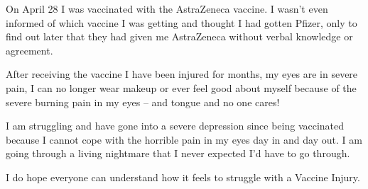 On April 28 I was vaccinated with the AstraZeneca vaccine. I wasn’t even
informed of which vaccine I was getting and thought I had gotten Pfizer, only to
find out later that they had given me AstraZeneca without verbal knowledge or
agreement.

After receiving the vaccine I have been injured for months, my eyes are in
severe pain, I can no longer wear makeup or ever feel good about myself because
of the severe burning pain in my eyes – and tongue and no one cares!

I am struggling and have gone into a severe depression since being vaccinated
because I cannot cope with the horrible pain in my eyes day in and day out. I am
going through a living nightmare that I never expected I’d have to go through.

I do hope everyone can understand how it feels to struggle with a Vaccine
Injury.

